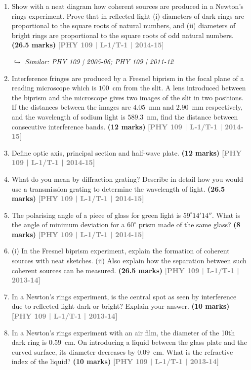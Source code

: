 \documentclass[12pt,a3paper]{article}
\newcommand{\yr}[1]{\hfill\textcolor{gray}{\small\textbf{[#1]}}}
\newcommand{\mk}[1]{\textcolor{orange!70!black}{\small\textbf{(#1 marks)}}}
\newcommand{\variant}[1]{\par\vspace{1pt}\textcolor{blue!50!black}%
  {\footnotesize\textit{$\hookrightarrow$ Similar: #1}}}
\begin{document}
\begin{enumerate}

\item Show with a neat diagram how coherent sources are produced in a Newton's rings experiment. Prove that in reflected light (i) diameters of dark rings are proportional to the square roots of natural numbers, and (ii) diameters of bright rings are proportional to the square roots of odd natural numbers.
\mk{26.5} \yr{PHY 109 | L-1/T-1 | 2014-15}
\variant{PHY 109 | 2005-06; PHY 109 | 2011-12}

\item Interference fringes are produced by a Fresnel biprism in the focal plane of a reading microscope which is $100$~cm from the slit. A lens introduced between the biprism and the microscope gives two images of the slit in two positions. If the distances between the images are $4.05$~mm and $2.90$~mm respectively, and the wavelength of sodium light is $589.3$~nm, find the distance between consecutive interference bands.
\mk{12} \yr{PHY 109 | L-1/T-1 | 2014-15}

\item Define optic axis, principal section and half-wave plate.
\mk{12} \yr{PHY 109 | L-1/T-1 | 2014-15}

\item What do you mean by diffraction grating? Describe in detail how you would use a transmission grating to determine the wavelength of light.
\mk{26.5} \yr{PHY 109 | L-1/T-1 | 2014-15}

\item The polarising angle of a piece of glass for green light is $59^\circ 14' 14''$. What is the angle of minimum deviation for a $60^\circ$ prism made of the same glass?
\mk{8} \yr{PHY 109 | L-1/T-1 | 2014-15}

\item (i) In the Fresnel biprism experiment, explain the formation of coherent sources with neat sketches. (ii) Also explain how the separation between such coherent sources can be measured.
\mk{26.5} \yr{PHY 109 | L-1/T-1 | 2013-14}

\item In a Newton's rings experiment, is the central spot as seen by interference due to reflected light dark or bright? Explain your answer.
\mk{10} \yr{PHY 109 | L-1/T-1 | 2013-14}

\item In a Newton's rings experiment with an air film, the diameter of the 10th dark ring is $0.59$~cm. On introducing a liquid between the glass plate and the curved surface, its diameter decreases by $0.09$~cm. What is the refractive index of the liquid?
\mk{10} \yr{PHY 109 | L-1/T-1 | 2013-14}


\end{enumerate}
\end{document}
